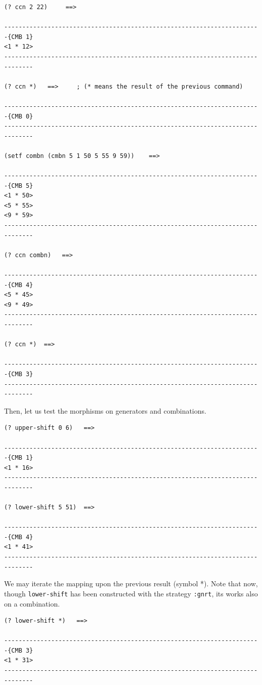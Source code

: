{\footnotesize\begin{verbatim}
(? ccn 2 22)     ==>

-----------------------------------------------------------------------{CMB 1}
<1 * 12>
------------------------------------------------------------------------------

(? ccn *)   ==>     ; (* means the result of the previous command)

-----------------------------------------------------------------------{CMB 0}
------------------------------------------------------------------------------

(setf combn (cmbn 5 1 50 5 55 9 59))    ==>

-----------------------------------------------------------------------{CMB 5}
<1 * 50>
<5 * 55>
<9 * 59>
------------------------------------------------------------------------------

(? ccn combn)   ==>

-----------------------------------------------------------------------{CMB 4}
<5 * 45>
<9 * 49>
------------------------------------------------------------------------------

(? ccn *)  ==>

-----------------------------------------------------------------------{CMB 3}
------------------------------------------------------------------------------
\end{verbatim}}
Then, let us test the morphisms on generators and combinations.
{\footnotesize\begin{verbatim}
(? upper-shift 0 6)   ==>

-----------------------------------------------------------------------{CMB 1}
<1 * 16>
------------------------------------------------------------------------------

(? lower-shift 5 51)  ==>

-----------------------------------------------------------------------{CMB 4}
<1 * 41>
------------------------------------------------------------------------------
\end{verbatim}}
We may iterate the mapping  upon the previous result (symbol *).
Note that now, though {\tt lower-shift} has been constructed with 
the strategy {\tt :gnrt}, its works also on a combination.
{\footnotesize\begin{verbatim}
(? lower-shift *)   ==>

-----------------------------------------------------------------------{CMB 3}
<1 * 31>
------------------------------------------------------------------------------
\end{verbatim}}

